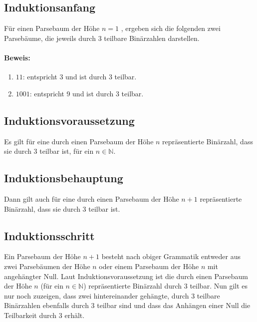\documentclass[a4paper,10pt]{scrartcl}
\begin{document}
\subsection*{Induktionsanfang}
Für einen Parsebaum der Höhe $n = 1$ , ergeben sich die folgenden zwei Parsebäume, die jeweils durch 3 teilbare Binärzahlen darstellen.
\paragraph{Beweis:}

\begin{enumerate}
 \item $11$: entspricht 3 und ist durch 3 teilbar.
 \item $1001$: entspricht 9 und ist durch 3 teilbar.
\end{enumerate}

\subsection*{Induktionsvoraussetzung}
Es gilt für eine durch einen Parsebaum der Höhe $n$ repräsentierte Binärzahl, dass sie durch 3 teilbar ist, für ein $n \in \mathbb{N}$.
\subsection*{Induktionsbehauptung}
Dann gilt auch für eine durch einen Parsebaum der Höhe $n + 1$ repräsentierte Binärzahl, dass sie durch 3 teilbar ist.
\subsection*{Induktionsschritt}
Ein Parsebaum der Höhe $n + 1$ besteht nach obiger Grammatik entweder aus zwei Parsebäumen der Höhe $n$ oder einem Parsebaum der Höhe $n$ mit angehängter Null.
Laut Induktionsvoraussetzung ist die durch einen Parsebaum der Höhe $n$ (für ein $n \in \mathbb{N}$) repräsentierte Binärzahl durch 3 teilbar.
Nun gilt es nur noch zuzeigen, dass zwei hintereinander gehängte, durch 3 teilbare Binärzahlen ebenfalls durch 3 teilbar sind und dass das Anhängen einer Null die Teilbarkeit durch 3 erhält.
\end{document}

